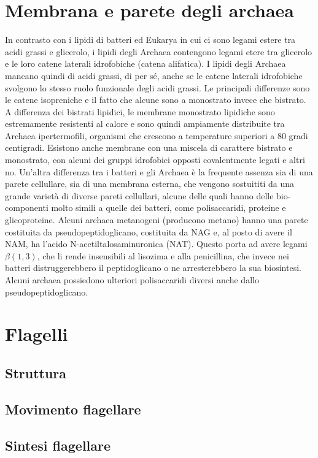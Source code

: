 \section{Membrana e parete degli archaea}
In contrasto con i lipidi di batteri ed Eukarya in cui ci sono legami estere tra acidi grassi e glicerolo, i lipidi degli Archaea contengono legami etere 
tra glicerolo e le loro catene laterali idrofobiche (catena alifatica). I lipidi degli Archaea mancano quindi di acidi grassi, di per sé, anche se le catene 
laterali idrofobiche svolgono lo stesso ruolo funzionale degli acidi grassi. 
Le principali differenze sono le catene isopreniche e il fatto che alcune sono 
a monostrato invece che bistrato. A differenza dei bistrati lipidici, le membrane monostrato lipidiche sono estremamente resistenti al calore e sono quindi 
ampiamente distribuite tra Archaea ipertermofili, organismi che crescono a temperature superiori a 80 gradi centigradi. Esistono anche membrane con una 
miscela di carattere bistrato e monostrato, con alcuni dei gruppi idrofobici opposti covalentmente legati e altri no. Un’altra differenza tra i batteri e 
gli Archaea è la frequente assenza sia di una parete cellullare, sia di una membrana esterna, che vengono sostuititi da una grande varietà di diverse pareti 
cellullari, alcune delle quali hanno delle bio-componenti molto simili a quelle dei batteri, come polisaccaridi, proteine e glicoproteine. Alcuni archaea 
metanogeni (producono metano) hanno una parete costituita da pseudopeptidoglicano, costituita da NAG e, al posto di avere il NAM, ha 
l’acido N-acetiltalosaminuronica (NAT). Questo porta ad avere legami $\beta(1, 3)$, che li rende insensibili al lisozima e 
alla penicillina, che invece nei batteri distruggerebbero il peptidoglicano o ne arresterebbero la sua biosintesi. Alcuni archaea possiedono ulteriori polisaccaridi diversi anche dallo 
pseudopeptidoglicano.
\section{Flagelli}

\subsection{Struttura}

\subsection{Movimento flagellare}

\subsection{Sintesi flagellare}

